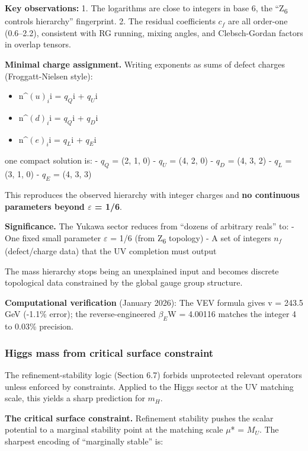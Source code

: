 \documentclass[11pt,a4paper]{article}
\theoremstyle{remark}
\providecommand{\tightlist}{%
  \setlength{\itemsep}{0pt}\setlength{\parskip}{0pt}}
\begin{document}
\textbf{Key observations:}
1. The logarithms are close to integers in base 6, the ``Z\textsubscript{6} controls hierarchy''
fingerprint.
2. The residual coefficients \(c_f\) are all order-one (0.6--2.2), consistent with
RG running, mixing angles, and Clebsch-Gordan factors in overlap tensors.

\textbf{Minimal charge assignment.} Writing exponents as sums of defect charges (Froggatt-Nielsen style):

\begin{itemize}
\tightlist
\item
  n\^{}\((u)_i\)i = \(q_Q\)i + \(q_U\)i
\item
  n\^{}\((d)_i\)i = \(q_Q\)i + \(q_D\)i
\item
  n\^{}\((e)_i\)i = \(q_L\)i + \(q_E\)i
\end{itemize}

one compact solution is:
- \(q_Q\) = (2, 1, 0)
- \(q_U\) = (4, 2, 0)
- \(q_D\) = (4, 3, 2)
- \(q_L\) = (3, 1, 0)
- \(q_E\) = (4, 3, 3)

This reproduces the observed hierarchy with integer charges and \textbf{no continuous
parameters beyond \ensuremath{\varepsilon} = 1/6}.

\textbf{Significance.} The Yukawa sector reduces from ``dozens of arbitrary reals'' to:
- One fixed small parameter \ensuremath{\varepsilon} = 1/6 (from Z\textsubscript{6} topology)
- A set of integers \(n_f\) (defect/charge data) that the UV completion must output

The mass hierarchy stops being an unexplained input and becomes discrete
topological data constrained by the global gauge group structure.

\textbf{Computational verification} (January 2026): The VEV formula gives v = 243.5 GeV
(-1.1\% error); the reverse-engineered \(\ensuremath{\beta}_E\)W = 4.00116 matches the integer 4
to 0.03\% precision.

\subsubsection{Higgs mass from critical surface constraint}\label{higgs-mass-from-critical-surface-constraint}

The refinement-stability logic (Section 6.7) forbids unprotected relevant operators unless enforced by constraints. Applied to the Higgs sector at the UV matching scale, this yields a sharp prediction for \(m_H\).

\textbf{The critical surface constraint.} Refinement stability pushes the scalar potential to a marginal stability point at the matching scale \ensuremath{\mu}* = \(M_U\). The sharpest encoding of ``marginally stable'' is:
\end{document}
